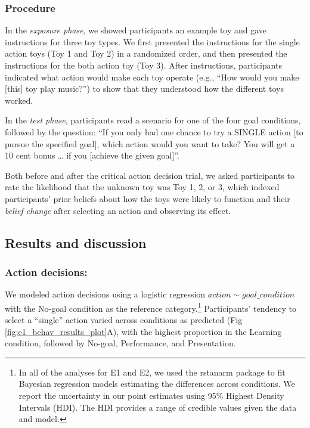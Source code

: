 \documentclass[10pt, letterpaper]{article}
\begin{document}
\subsubsection{Procedure}\label{procedure}

In the \emph{exposure phase}, we showed participants an example toy and
gave instructions for three toy types. We first presented the
instructions for the single action toys (Toy 1 and Toy 2) in a
randomized order, and then presented the instructions for the both
action toy (Toy 3). After instructions, participants indicated what
action would make each toy operate (e.g., ``How would you make
{[}this{]} toy play music?'') to show that they understood how the
different toys worked.

In the \emph{test phase}, participants read a scenario for one of the
four goal conditions, followed by the question: ``If you only had one
chance to try a SINGLE action {[}to pursue the specified goal{]}, which
action would you want to take? You will get a 10 cent bonus \ldots{} if
you {[}achieve the given goal{]}''.

Both before and after the critical action decision trial, we asked
participants to rate the likelihood that the unknown toy was Toy 1, 2,
or 3, which indexed participants' prior beliefs about how the toys were
likely to function and their \emph{belief change} after selecting an
action and observing its effect.

\subsection{Results and discussion}\label{results-and-discussion}

\subsubsection{Action decisions:}\label{action-decisions}

We modeled action decisions using a logistic regression
\texttt{$action \sim goal\_condition$} with the No-goal condition as the
reference
category.\footnote{In all of the analyses for E1 and E2, we used the {\selectfont rstanarm} package to fit Bayesian regression models estimating the differences across conditions. We report the uncertainty in our point estimates using 95\% Highest Density Intervals (HDI). The HDI provides a range of credible values given the data and model.}
Participants' tendency to select a ``single'' action varied across
conditions as predicted (Fig \ref{fig:e1_behav_results_plot}A), with the
highest proportion in the Learning condition, followed by No-goal,
Performance, and Presentation.
\end{document}
